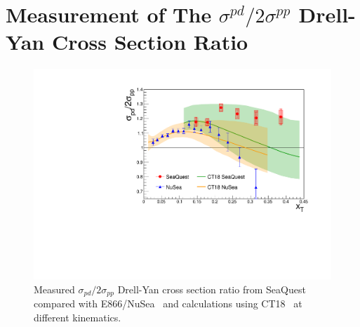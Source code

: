 \documentclass[reprint,aps,unsortedaddress,superscriptaddress,prd,floatfix,showpacs,linenumbers]{revtex4-2}
\begin{document}
\section{Measurement of The \texorpdfstring{$\sigma^{pd}/2\sigma^{pp}$}{pd/2pp} Drell-Yan Cross Section Ratio}
\begin{figure}[htbp!]
	\centering
	\includegraphics[width=\linewidth]{E906_E866_xT_CT18only.pdf}
	\caption{Measured $\sigma_{pd}/2\sigma_{pp}$ Drell-Yan cross section ratio from SeaQuest compared with E866/NuSea~\cite{towell2001}
		and calculations using CT18~\cite{hou2021} at different kinematics.}
	\label{fig:xT_csr}
\end{figure}

\end{document}
